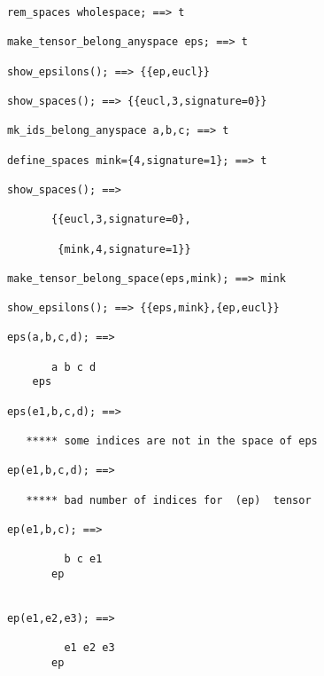 \begin{verbatim}
      rem_spaces wholespace; ==> t

      make_tensor_belong_anyspace eps; ==> t

      show_epsilons(); ==> {{ep,eucl}}

      show_spaces(); ==> {{eucl,3,signature=0}}

      mk_ids_belong_anyspace a,b,c; ==> t

      define_spaces mink={4,signature=1}; ==> t

      show_spaces(); ==>

             {{eucl,3,signature=0},

              {mink,4,signature=1}}

      make_tensor_belong_space(eps,mink); ==> mink

      show_epsilons(); ==> {{eps,mink},{ep,eucl}}

      eps(a,b,c,d); ==>

             a b c d
          eps

      eps(e1,b,c,d); ==>

         ***** some indices are not in the space of eps

      ep(e1,b,c,d); ==>

         ***** bad number of indices for  (ep)  tensor

      ep(e1,b,c); ==>

               b c e1
             ep


      ep(e1,e2,e3); ==>

               e1 e2 e3
             ep
\end{verbatim}

